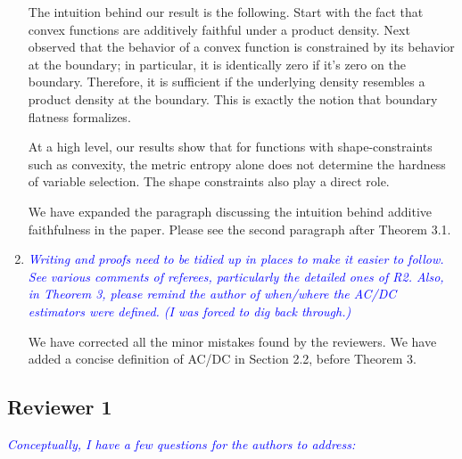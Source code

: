 \documentclass[pdftex,12pt]{article}
\def\rc#1{{\it\textcolor{blue}{#1}}\smallskip}
\begin{document}
\begin{enumerate}
The intuition behind our result is the following. Start with the fact
that convex functions are additively faithful under a product
density. Next observed that the behavior of a convex function is constrained
by its behavior at the boundary; in particular, it is identically zero
if it's zero on the boundary. Therefore, it is sufficient if the 
underlying density resembles a product density at the boundary.  This is
exactly the notion that boundary flatness formalizes.

At a high level, our results show that for functions with
shape-constraints such as convexity, the metric entropy alone does not
determine the hardness of variable selection.  The shape constraints
also play a direct role.

We have expanded the paragraph discussing the intuition behind
additive faithfulness in the paper. Please see the second paragraph
after Theorem 3.1.

\item \rc{Writing and proofs need to be tidied up in places to make it easier
to follow.  See various comments of referees, particularly the
detailed ones of R2.  Also, in Theorem 3, please remind the author of
when/where the AC/DC estimators were defined.  (I was forced to dig
back through.)}


We have corrected all the minor mistakes found by the reviewers.
We have added a concise definition of AC/DC in Section 2.2, before Theorem 3. 


\end{enumerate}

\subsection*{Reviewer 1}

\rc{Conceptually, I have a few questions for the authors to address:}
\end{document}
